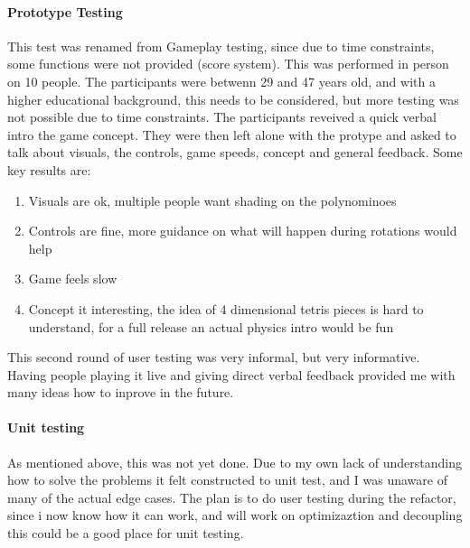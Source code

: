 \documentclass{article}
\begin{document}
\paragraph{Prototype Testing}
This test was renamed from Gameplay testing, since due to time constraints, some functions were not provided (score system).
This was performed in person on 10 people. The participants were betwenn 29 and 47 years old, and with a higher educational background, this needs to be considered, but more testing was not possible due to time constraints.\newline
The participants reveived a quick verbal intro the game concept. They were then left alone with the protype and asked to talk about visuals, the controls, game speeds, concept and general feedback.
Some key results are:
\begin{enumerate}
    \item Visuals are ok, multiple people want shading on the polynominoes
    \item Controls are fine, more guidance on what will happen during rotations would help
    \item Game feels slow
    \item Concept it interesting, the idea of 4 dimensional tetris pieces is hard to understand, for a full release an actual physics intro would be fun
\end{enumerate}
This second round of user testing was very informal, but very informative. Having people playing it live and giving direct verbal feedback provided me with many ideas how to inprove in the future.

\paragraph{Unit testing}
As mentioned above, this was not yet done. Due to my own lack of understanding how to solve the problems it felt constructed to unit test, and I was unaware of many of the actual edge cases. The plan is to do user testing during the refactor, since i now know how it can work, and will work on optimizaztion and decoupling this could be a good place for unit testing.
\end{document}
